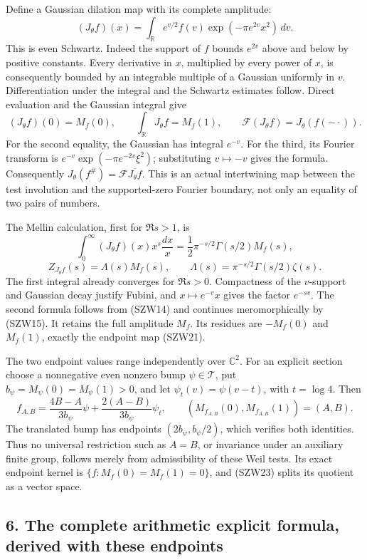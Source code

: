 \documentclass[
  10pt,
  a4paper,
]{article}
\begin{document}
Define a Gaussian dilation map with its complete amplitude: \[
\boxed{(J_\theta f)(x)=\int_{\mathbb R}e^{v/2}f(v)
\exp(-\pi e^{2v}x^2)\,dv.}
\tag{SZW20}
\] This is even Schwartz. Indeed the support of \(f\) bounds \(e^{2v}\)
above and below by positive constants. Every derivative in \(x\),
multiplied by every power of \(x\), is consequently bounded by an
integrable multiple of a Gaussian uniformly in \(v\). Differentiation
under the integral and the Schwartz estimates follow. Direct evaluation
and the Gaussian integral give \[
(J_\theta f)(0)=M_f(0),\qquad
\int_{\mathbb R}J_\theta f=M_f(1),\qquad
\mathcal F(J_\theta f)=J_\theta(f(-\cdot)).
\tag{SZW21}
\] For the second equality, the Gaussian has integral \(e^{-v}\). For
the third, its Fourier transform is \(e^{-v}\exp(-\pi e^{-2v}\xi^2)\);
substituting \(v\mapsto-v\) gives the formula. Consequently
\(J_\theta(f^\#)=\mathcal F\overline{J_\theta f}\). This is an actual
intertwining map between the test involution and the supported-zero
Fourier boundary, not only an equality of two pairs of numbers.

The Mellin calculation, first for \(\Re s>1\), is \[
\int_0^\infty (J_\theta f)(x)x^s\frac{dx}{x}
=\frac12\pi^{-s/2}\Gamma(s/2)M_f(s),
\] \[
\boxed{Z_{J_\theta f}(s)=\Lambda(s)M_f(s),\qquad
\Lambda(s)=\pi^{-s/2}\Gamma(s/2)\zeta(s).}
\tag{SZW22}
\] The first integral already converges for \(\Re s>0\). Compactness of
the \(v\)-support and Gaussian decay justify Fubini, and
\(x\mapsto e^{-v}x\) gives the factor \(e^{-sv}\). The second formula
follows from (SZW14) and continues meromorphically by (SZW15). It
retains the full amplitude \(M_f\). Its residues are \(-M_f(0)\) and
\(M_f(1)\), exactly the endpoint map (SZW21).

The two endpoint values range independently over \(\mathbb C^2\). For an
explicit section choose a nonnegative even nonzero bump
\(\psi\in\mathcal T\), put \(b_\psi=M_\psi(0)=M_\psi(1)>0\), and let
\(\psi_t(v)=\psi(v-t)\), with \(t=\log4\). Then \[
f_{A,B}=\frac{4B-A}{3b_\psi}\psi
+\frac{2(A-B)}{3b_\psi}\psi_t,
\qquad (M_{f_{A,B}}(0),M_{f_{A,B}}(1))=(A,B).
\tag{SZW23}
\] The translated bump has endpoints \((2b_\psi,b_\psi/2)\), which
verifies both identities. Thus no universal restriction such as \(A=B\),
or invariance under an auxiliary finite group, follows merely from
admissibility of these Weil tests. Its exact endpoint kernel is
\(\{f:M_f(0)=M_f(1)=0\}\), and (SZW23) splits its quotient as a vector
space.

\subsection{6. The complete arithmetic explicit formula, derived with
these
endpoints}\label{the-complete-arithmetic-explicit-formula-derived-with-these-endpoints}
\end{document}
